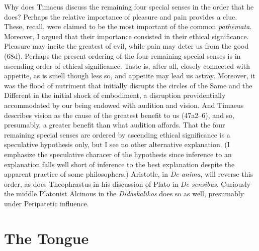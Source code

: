 Why does Timaeus discuss the remaining four special senses in the order that he does? Perhaps the relative importance of pleasure and pain provides a clue. These, recall, were claimed to be the most important of the common \emph{pathēmata}. Moreover, I argued that their importance consisted in their ethical significance. Pleasure may incite the greatest of evil, while pain may deter us from the good (68d). Perhaps the present ordering of the four remaining special senses is in ascending order of ethical significance. Taste is, after all, closely connected with appetite, as is smell though less so, and appetite may lead us astray. Moreover, it was the flood of nutriment that initially disrupts the circles of the Same and the Different in the initial shock of embodiment, a disruption providentially accommodated by our being endowed with audition and vision. And Timaeus describes vision as the cause of the greatest benefit to us (47a2--6), and so, presumably, a greater benefit than what audition affords. That the four remaining special senses are ordered by ascending ethical significance is a speculative hypothesis only, but I see no other alternative explanation. (I emphasize the speculative characer of the hypothesis since inference to an explanation falls well short of inference to the best explanation despite the apparent practice of some philosophers.) Aristotle, in \emph{De anima}, will reverse this order, as does Theophrastus in his discussion of Plato in \emph{De sensibus}. Curiously the middle Platonist Alcinous in the \emph{Didaskalikos} does so as well, presumably under Peripatetic influence.


\section{The Tongue} %
\label{sec:the_tongue}

